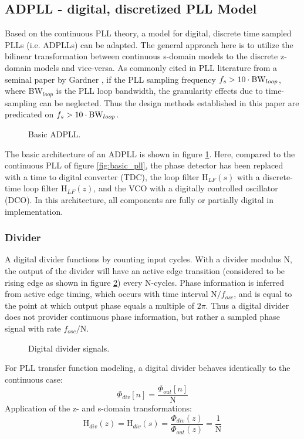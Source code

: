 \subsection{ADPLL - digital, discretized PLL Model}\label{adpll_model}
Based on the continuous PLL theory, a model for digital, discrete time sampled PLLs (i.e. ADPLLs) can be adapted. The general approach here is to utilize the bilinear transformation between continuous s-domain models to the discrete z-domain models and vice-versa. As commonly cited in PLL literature from a seminal paper by Gardner \cite{gardner_1980}, if the PLL sampling frequency $f_s > 10\cdot\textnormal{BW}_{loop}$, where BW$_{loop}$ is the PLL loop bandwidth, the granularity effects due to time-sampling can be neglected. Thus the design methods established in this paper are predicated on $f_s > 10\cdot\textnormal{BW}_{loop}$.
\begin{figure}[htb!]
	\center
	\caption{Basic ADPLL.}
	\label{fig:basic_adpll}
\end{figure}
\FloatBarrier
The basic architecture of an ADPLL is shown in figure \ref{fig:basic_adpll}. Here, compared to the continuous PLL of figure \ref{fig:basic_pll}, the phase detector has been replaced with a time to digital converter (TDC), the loop filter $\mathrm{H}_{LF}(s)$ with a discrete-time loop filter $\mathrm{H}_{LF}(z)$, and the VCO with a digitally controlled oscillator (DCO). In this architecture, all components are fully or partially digital in implementation. 

\subsubsection{Divider}\label{div_theory}
	A digital divider functions by counting input cycles. With a divider modulus N, the output of the divider will have an active edge transition (considered to be rising edge as shown in figure \ref{fig:digital_div}) every N-cycles. Phase information is inferred from active edge timing, which occurs with time interval N$/f_{osc}$, and is equal to the point at which output phase equals a multiple of $2\pi$. Thus a digital divider does not provider continuous phase information, but rather a sampled phase signal with rate $f_{osc}/$N. 
	\begin{figure}[htb!]
		\center
		\caption{Digital divider signals.}
		\label{fig:digital_div}
	\end{figure}

	For PLL transfer function modeling, a digital divider behaves identically to the continuous case:
	\begin{equation}
		\Phi_{div}[n] = \frac{\Phi_{out}[n]}{\mathrm{N}}
	\end{equation}
	Application of the z- and s-domain transformations:
	\begin{equation}
		\mathrm{H}_{div}(z) = \mathrm{H}_{div}(s) = \frac{\Phi_{div}(z)}{\Phi_{out}(z)} = \frac{1}{\mathrm{N}}
	\end{equation}

